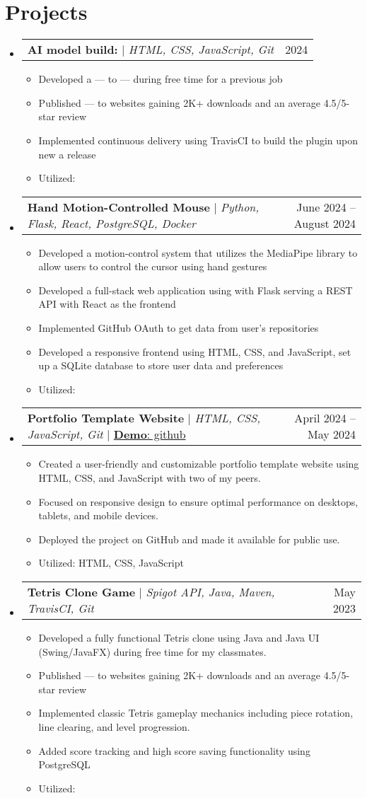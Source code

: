 \documentclass[letterpaper,11pt]{article}
\makeatletter
\newcommand{\resumeItem}[1]{
  \item\small{
    {#1 \vspace{-2pt}}
  }
}
\newcommand{\resumeProjectHeading}[2]{
    \item
    \begin{tabular*}{0.97\textwidth}{l@{\extracolsep{\fill}}r@{\hspace{-0.2in}}}
        \small#1 & #2 \\
    \end{tabular*}\vspace{-7pt}
}
\newcommand{\resumeSubHeadingListStart}{\begin{itemize}[leftmargin=0.00in, rightmargin=-0.2in, label={}]}
\newcommand{\resumeSubHeadingListEnd}{\end{itemize}}
\newcommand{\resumeItemListStart}{\begin{itemize}[leftmargin=0.15in]}
\newcommand{\resumeItemListEnd}{\end{itemize}\vspace{-5pt}}
\makeatother
\begin{document}
\section{Projects}
    \resumeSubHeadingListStart
        \resumeProjectHeading
            {\textbf{AI model build: } $|$ \emph{HTML, CSS, JavaScript, Git}}{2024}
            \resumeItemListStart
                \resumeItem{Developed a --- to --- during free time for a previous job}
                \resumeItem{Published --- to websites gaining 2K+ downloads and an average 4.5/5-star review}
                \resumeItem{Implemented continuous delivery using TravisCI to build the plugin upon new a release}
                \resumeItem{Utilized: }
            \resumeItemListEnd
        \resumeProjectHeading
            {\textbf{Hand Motion-Controlled Mouse} $|$ \emph{Python, Flask, React, PostgreSQL, Docker}}{June 2024 -- August 2024}
            \resumeItemListStart
                \resumeItem{Developed a motion-control system that utilizes the MediaPipe library to allow users to control the cursor using hand gestures}
                \resumeItem{Developed a full-stack web application using with Flask serving a REST API with React as the frontend}
                \resumeItem{Implemented GitHub OAuth to get data from user’s repositories}
                \resumeItem{Developed a responsive frontend using HTML, CSS, and JavaScript, set up a SQLite database to store user data and preferences}
                \resumeItem{Utilized: }
            \resumeItemListEnd
        \resumeProjectHeading
            {\textbf{Portfolio Template Website} $|$ \emph{HTML, CSS, JavaScript, Git} $|$ \href{https://github.com/juhun32/portfolio-template-project}{\textbf{Demo}: github}}{April 2024 -- May 2024}
            \resumeItemListStart
                \resumeItem{Created a user-friendly and customizable portfolio template website using HTML, CSS, and JavaScript with two of my peers.}
                \resumeItem{Focused on responsive design to ensure optimal performance on desktops, tablets, and mobile devices.}
                \resumeItem{Deployed the project on GitHub and made it available for public use.}
                \resumeItem{Utilized: HTML, CSS, JavaScript}
            \resumeItemListEnd
        \resumeProjectHeading
            {\textbf{Tetris Clone Game} $|$ \emph{Spigot API, Java, Maven, TravisCI, Git}}{May 2023}
            \resumeItemListStart
                \resumeItem{Developed a fully functional Tetris clone using Java and Java UI (Swing/JavaFX) during free time for my classmates.}
                \resumeItem{Published --- to websites gaining 2K+ downloads and an average 4.5/5-star review}
                \resumeItem{Implemented classic Tetris gameplay mechanics including piece rotation, line clearing, and level progression.}
                \resumeItem{Added score tracking and high score saving functionality using PostgreSQL}
                \resumeItem{Utilized: }
            \resumeItemListEnd
    \resumeSubHeadingListEnd
\end{document}
